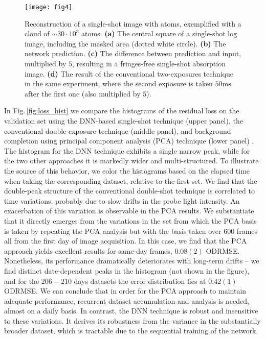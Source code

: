 \documentclass[twocolumn,groupedaddress,longbibliography]{revtex4-1}
\begin{document}
\begin{figure*}
\centering
\texttt{[image: fig4]}
\caption{Reconstruction of a single-shot image with atoms, exemplified with a cloud of $\sim30\cdot10^3$ atoms.
	\textbf{(a)} The central square of a single-shot log image, including the masked area (dotted white circle).
	\textbf{(b)} The network prediction.
	\textbf{(c)} The difference between prediction and input, multiplied by $5$, resulting in a fringes-free single-shot absorption image.
	\textbf{(d)} The result of the conventional two-exposures technique in the same experiment, where the second exposure is taken $50\mathrm{ms}$ after the first one (also multiplied by $5$).
}
\label{fig:with_atoms}
\end{figure*}

In Fig.\,\ref{fig:loss_hist} we compare the histograms of the residual loss on the validation set using the DNN-based single-shot technique (upper panel), the conventional double-exposure technique (middle panel), and background completion using principal component analysis (PCA) technique (lower panel) \cite{Niu2018}. The histogram for the DNN technique exhibits a single narrow peak, while for the two other approaches it is markedly wider and multi-structured. To illustrate the source of this behavior, we color the histograms based on the elapsed time when taking the corresponding dataset, relative to the first set. We find that the double-peak structure of the conventional double-shot technique is correlated to time variations, probably due to slow drifts in the probe light intensity. An exacerbation of this variation is observable in the PCA results. We substantiate that it directly emerges from the variations in the set from which the PCA basis is taken by repeating the PCA analysis but with the basis taken over $600$ frames all from the first day of image acquisition. In this case, we find that the PCA approach yields excellent results for same-day frames, $0.08(2)$ ODRMSE. Nonetheless, its performance dramatically deteriorates with long-term drifts -- we find distinct date-dependent peaks in the histogram (not shown in the figure), and for the $206-210$ days datasets the error distribution lies at $0.42(1)$ ODRMSE. We can conclude that in order for the PCA approach to maintain adequate performance, recurrent dataset accumulation and analysis is needed, almost on a daily basis. In contrast, the DNN technique is robust and insensitive to these variations. It derives its robustness from the variance in the substantially broader dataset, which is tractable due to the sequential training of the network.
\end{document}
